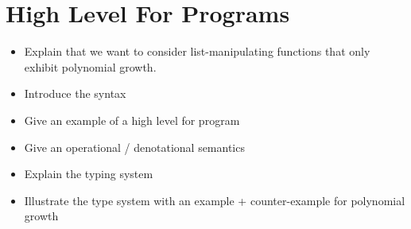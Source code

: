 \section{High Level For Programs}
\label{sec:high_level}

\begin{itemize}
    \item Explain that we want to consider list-manipulating functions
          that only exhibit polynomial growth.
    \item Introduce the syntax
    \item Give an example of a high level for program
    \item Give an operational / denotational semantics
    \item Explain the typing system
    \item Illustrate the type system with an example + counter-example for polynomial growth
\end{itemize}


